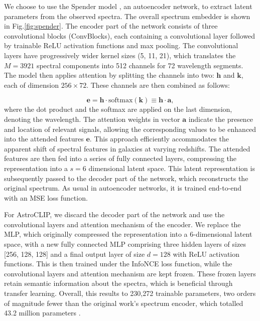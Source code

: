 \documentclass[a4paper,12pt]{article}
\begin{document}
We choose to use the Spender model \cite{spender}, an autoencoder network, to extract latent parameters from the observed spectra. The overall spectrum embedder is shown in Fig.\ref{fig:spender}. The encoder part of the network consists of three convolutional blocks (ConvBlocks), each containing a convolutional layer followed by trainable ReLU activation functions and max pooling. The convolutional layers have progressively wider kernel sizes (5, 11, 21), which translates the $M=3921$ spectral components into 512 channels for 72 wavelength segments.  The model then applies attention by splitting the channels into two: $\mathbf{h}$ and $\mathbf{k}$, each of dimension $256 \times 72$. These channels are then combined as follows:


\begin{equation}
    \mathbf{e} = \mathbf{h} \cdot \text{softmax}(\mathbf{k}) \equiv \mathbf{h} \cdot \mathbf{a},
\end{equation}
where the dot product and the softmax are applied on the last dimension, denoting the wavelength. The attention weights in vector $\mathbf{a}$ indicate the presence and location of relevant signals, allowing the corresponding values to be enhanced into the attended features $\mathbf{e}$. This approach efficiently accommodates the apparent shift of spectral features in galaxies at varying redshifts. The attended features are then fed into a series of fully connected layers, compressing the representation into a $s=6$ dimensional latent space. This latent representation is subsequently passed to the decoder part of the network, which reconstructs the original spectrum. As usual in autoencoder networks, it is trained end-to-end with an MSE loss function.

For AstroCLIP, we discard the decoder part of the network and use the convolutional layers and attention mechanism of the encoder. We replace the MLP, which originally compressed the representation into a 6-dimensional latent space, with a new fully connected MLP comprising three hidden layers of sizes [256, 128, 128] and a final output layer of size $d=128$ with ReLU activation functions. This is then trained under the InfoNCE loss function, while the convolutional layers and attention mechanism are kept frozen. These frozen layers retain semantic information about the spectra, which is beneficial through transfer learning. Overall, this results to 230,272 trainable parameters, two orders of magnitude fewer than the original work's spectrum encoder, which totalled 43.2 million parameters \cite{astroclip}.
\end{document}
